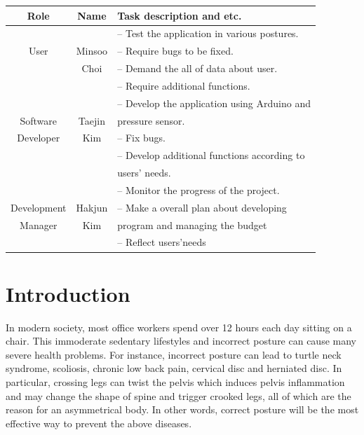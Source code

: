 \documentclass[conference]{IEEEtran}
\begin{document}
\begin{table}

\begin{tabular}{|c|c|l|}\hline

Role & Name & Task description and etc. \\ \hline \hline

&  &  -- Test the application in various postures. \\ 

User & Minsoo & -- Require bugs to be fixed.  \\ 

& Choi & -- Demand the all of data about user. \\ 

&  & -- Require additional functions. \\ \hline

&  &  -- Develop the application using Arduino and\\ 

Software & Taejin & pressure sensor. \\ 

Developer & Kim & -- Fix bugs. \\ 

&  & -- Develop additional functions according to\\ 

&  & users' needs. \\ \hline

&  &  -- Monitor the progress of the project. \\ 

Development & Hakjun & -- Make a overall plan about developing \\ 

Manager& Kim & program and managing the budget \\ 

&  & -- Reflect users'needs \\ \hline

\end{tabular}

\end{table}


\IEEEpeerreviewmaketitle
\large


\section{Introduction}

In modern society, most office workers spend over 12 hours each day sitting on a chair. This immoderate sedentary lifestyles and incorrect posture can cause many severe health problems. For instance, incorrect posture can lead to turtle neck syndrome, scoliosis, chronic low back pain, cervical disc and herniated disc. In particular, crossing legs can twist the pelvis which induces pelvis inflammation and may change the shape of spine and trigger crooked legs, all of which are the reason for an asymmetrical body. In other words, correct posture will be the most effective way to prevent the above diseases.
\end{document}
